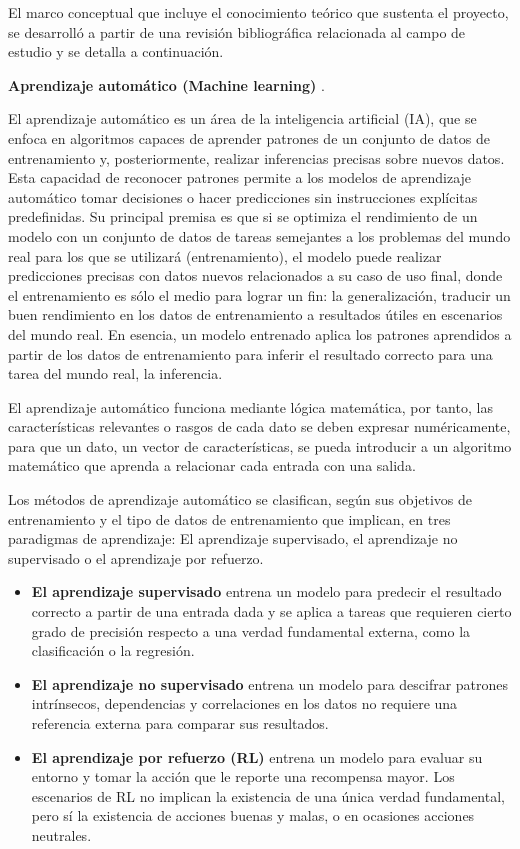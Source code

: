 El marco conceptual que incluye el conocimiento teórico que sustenta el proyecto, se desarrolló a partir de una revisión bibliográfica relacionada al campo de estudio y se detalla a continuación.

\textbf{Aprendizaje automático (Machine learning)} \citep{bergmann2026,universidadeuropea2025,mayorga2019}.

El aprendizaje automático es un área de la inteligencia artificial (IA), que se enfoca en algoritmos capaces de aprender patrones de un conjunto de datos de entrenamiento y, posteriormente, realizar inferencias precisas sobre nuevos datos. Esta capacidad de reconocer patrones permite a los modelos de aprendizaje automático tomar decisiones o hacer predicciones sin instrucciones explícitas predefinidas. Su principal premisa es que si se optimiza el rendimiento de un modelo con un conjunto de datos de tareas semejantes a los problemas del mundo real para los que se utilizará (entrenamiento), el modelo puede realizar predicciones precisas con datos nuevos relacionados a su caso de uso final, donde el entrenamiento es sólo el medio para lograr un fin: la generalización, traducir un buen rendimiento en los datos de entrenamiento a resultados útiles en escenarios del mundo real. En esencia, un modelo entrenado aplica los patrones aprendidos a partir de los datos de entrenamiento para inferir el resultado correcto para una tarea del mundo real, la inferencia.

El aprendizaje automático funciona mediante lógica matemática, por tanto, las características relevantes o rasgos de cada dato se deben expresar numéricamente, para que un dato, un vector de características, se pueda introducir a un algoritmo matemático que aprenda a relacionar cada entrada con una salida.

Los métodos de aprendizaje automático se clasifican, según sus objetivos de entrenamiento y el tipo de datos de entrenamiento que implican, en tres paradigmas de aprendizaje: El aprendizaje supervisado, el aprendizaje no supervisado o el aprendizaje por refuerzo.

\begin{itemize}
\item
  \textbf{El aprendizaje supervisado} entrena un modelo para predecir el resultado correcto a partir de una entrada dada y se aplica a tareas que requieren cierto grado de precisión respecto a una verdad fundamental externa, como la clasificación o la regresión.
\item
  \textbf{El aprendizaje no supervisado} entrena un modelo para descifrar patrones intrínsecos, dependencias y correlaciones en los datos no requiere una referencia externa para comparar sus resultados.
\item
  \textbf{El aprendizaje por refuerzo (RL)} entrena un modelo para evaluar su entorno y tomar la acción que le reporte una recompensa mayor. Los escenarios de RL no implican la existencia de una única verdad fundamental, pero sí la existencia de acciones buenas y malas, o en ocasiones acciones neutrales.
\end{itemize}

